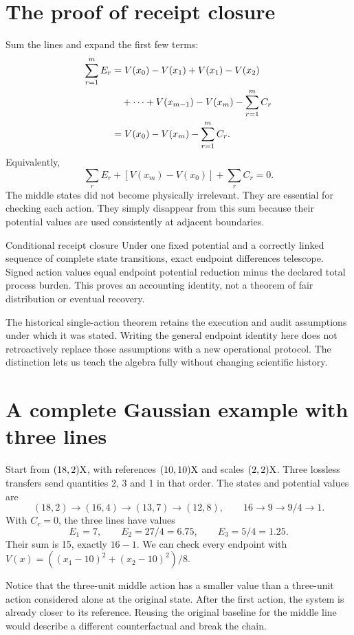 \section{The proof of receipt closure}
Sum the lines and expand the first few terms:
\begin{align}
 \sum_{r=1}^{m}E_r
 &=V(x_0)-V(x_1)+V(x_1)-V(x_2)\notag\\
 &\quad+\cdots+V(x_{m-1})-V(x_m)-\sum_{r=1}^{m}C_r\\
 &=V(x_0)-V(x_m)-\sum_{r=1}^{m}C_r.
\end{align}
Equivalently,
\begin{equation}\label{eq:receipt-closure}
 \sum_rE_r+\left[V(x_m)-V(x_0)\right]+\sum_rC_r=0.
\end{equation}
The middle states did not become physically irrelevant. They are essential for checking each action. They simply disappear from this sum because their potential values are used consistently at adjacent boundaries.

\begin{lawbox}{Conditional receipt closure}
Under one fixed potential and a correctly linked sequence of complete state transitions, exact endpoint differences telescope. Signed action values equal endpoint potential reduction minus the declared total process burden. This proves an accounting identity, not a theorem of fair distribution or eventual recovery.
\end{lawbox}

The historical single-action theorem retains the execution and audit assumptions under which it was stated. Writing the general endpoint identity here does not retroactively replace those assumptions with a new operational protocol. The distinction lets us teach the algebra fully without changing scientific history.

\section{A complete Gaussian example with three lines}
Start from $(18,2)\mathrm{X}$, with references $(10,10)\mathrm{X}$ and scales $(2,2)\mathrm{X}$. Three lossless transfers send quantities 2, 3 and 1 in that order. The states and potential values are
\[
 (18,2)\to(16,4)\to(13,7)\to(12,8),
 \qquad 16\to9\to9/4\to1.
\]
With $C_r=0$, the three lines have values
\[
 E_1=7,\qquad E_2=27/4=6.75,\qquad E_3=5/4=1.25.
\]
Their sum is 15, exactly $16-1$. We can check every endpoint with $V(x)=((x_1-10)^2+(x_2-10)^2)/8$.

Notice that the three-unit middle action has a smaller value than a three-unit action considered alone at the original state. After the first action, the system is already closer to its reference. Reusing the original baseline for the middle line would describe a different counterfactual and break the chain.

